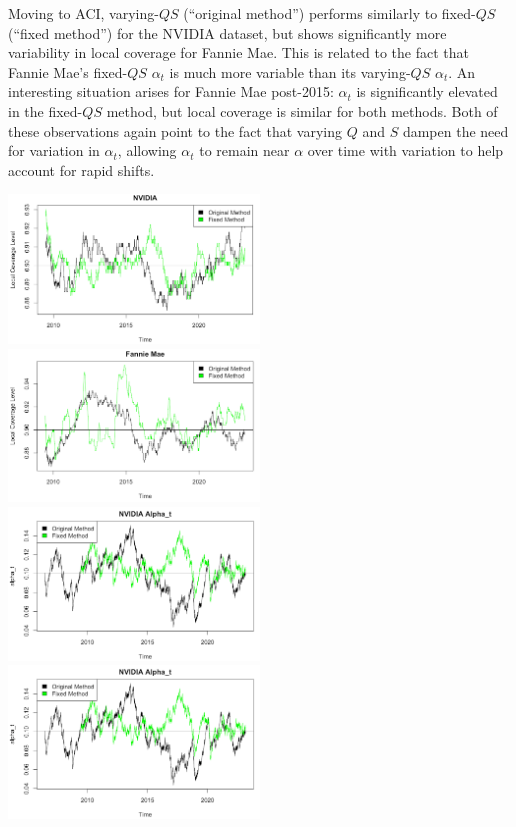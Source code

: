 \documentclass[
]{article}
\begin{document}
Moving to ACI, varying-\(QS\) (``original method'') performs similarly
to fixed-\(QS\) (``fixed method'') for the NVIDIA dataset, but shows
significantly more variability in local coverage for Fannie Mae. This is
related to the fact that Fannie Mae's fixed-\(QS\) \(\alpha_t\) is much
more variable than its varying-\(QS\) \(\alpha_t\). An interesting
situation arises for Fannie Mae post-2015: \(\alpha_t\) is significantly
elevated in the fixed-\(QS\) method, but local coverage is similar for
both methods. Both of these observations again point to the fact that
varying \(Q\) and \(S\) dampen the need for variation in \(\alpha_t\),
allowing \(\alpha_t\) to remain near \(\alpha\) over time with variation
to help account for rapid shifts.

\includegraphics[width=0.5\textwidth,height=\textheight]{./images/5nvidia2qs.png}
\includegraphics[width=0.5\textwidth,height=\textheight]{./images/6fm2qs.png}
\includegraphics[width=0.5\textwidth,height=\textheight]{./images/7nvidia3qs.png}
\includegraphics[width=0.5\textwidth,height=\textheight]{./images/8fm3qs.png}
\end{document}
